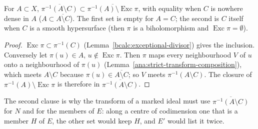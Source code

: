 \begin{lemma}
\label{bcalc:strict-geo}
\leanok
For \(A\subset X\), \(\overline{\pi^{-1}(A\setminus C)}\subset\overline{\pi^{-1}(A)\setminus\operatorname{Exc}\pi}\), with equality when \(C\) is nowhere
dense in \(A\) (\(A\subset\overline{A\setminus C}\)). The first set is empty for \(A=C\); the second is \(C\) itself when \(C\) is a smooth
hypersurface (then \(\pi\) is a biholomorphism and \(\operatorname{Exc}\pi=\emptyset\)).
\end{lemma}
\begin{proof}
\leanok
\(\operatorname{Exc}\pi\subset\pi^{-1}(C)\) (Lemma~\ref{bcalc:exceptional-divisor}) gives the inclusion. Conversely let \(\pi(u)\in A\),
\(u\notin\operatorname{Exc}\pi\). Then \(\pi\) maps every neighbourhood \(V\) of \(u\) onto a neighbourhood of \(\pi(u)\)
(Lemma~\ref{ana:strict-transform-composition}), which meets \(A\setminus C\) because \(\pi(u)\in\overline{A\setminus C}\); so \(V\) meets
\(\pi^{-1}(A\setminus C)\). The closure of \(\pi^{-1}(A)\setminus\operatorname{Exc}\pi\) is therefore in \(\overline{\pi^{-1}(A\setminus C)}\).
\end{proof}
The second clause is why the transform of a marked ideal must use \(\overline{\pi^{-1}(A\setminus C)}\) for \(N\) and for the members of
\(E\): along a centre of codimension one that is a member \(H\) of \(E\), the other set would keep \(H\), and \(E'\) would list it twice.

